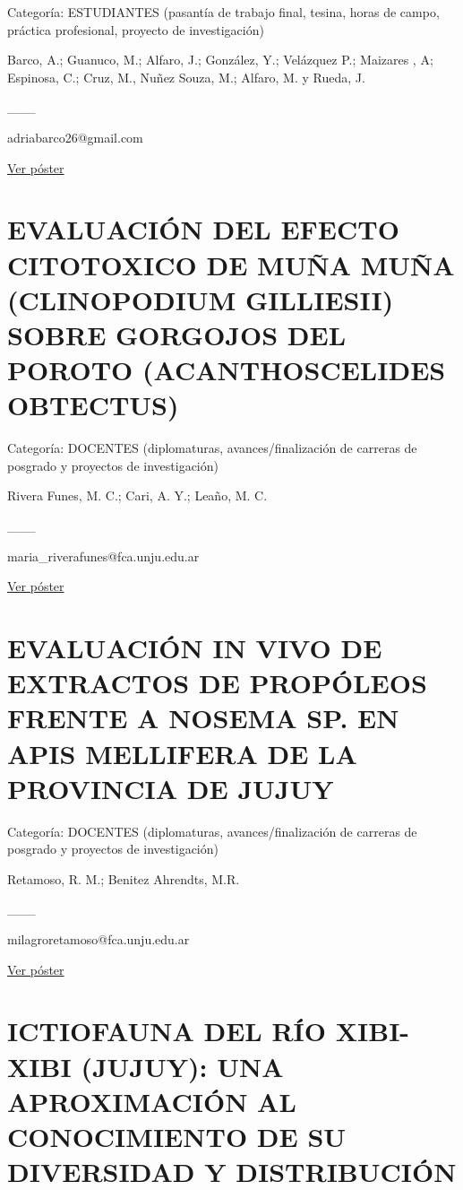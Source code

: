 \documentclass[
  spanish,
  letterpaper,
  DIV=11,
  numbers=noendperiod]{scrreprt}
\begin{document}
Categoría: ESTUDIANTES (pasantía de trabajo final, tesina, horas de
campo, práctica profesional, proyecto de investigación)

Barco, A.; Guanuco, M.; Alfaro, J.; González, Y.; Velázquez P.; Maizares
, A; Espinosa, C.; Cruz, M., Nuñez Souza, M.; Alfaro, M. y Rueda, J.

\_\_\_

adriabarco26@gmail.com

\href{https://drive.google.com/open?id=13i9UKtoZj7QZb9MhyCy5hMvrN237DWA4}{Ver
póster}

\section{EVALUACIÓN DEL EFECTO CITOTOXICO DE MUÑA MUÑA (CLINOPODIUM
GILLIESII) SOBRE GORGOJOS DEL POROTO (ACANTHOSCELIDES
OBTECTUS)}\label{evaluaciuxf3n-del-efecto-citotoxico-de-muuxf1a-muuxf1a-clinopodium-gilliesii-sobre-gorgojos-del-poroto-acanthoscelides-obtectus}

Categoría: DOCENTES (diplomaturas, avances/finalización de carreras de
posgrado y proyectos de investigación)

Rivera Funes, M. C.; Cari, A. Y.; Leaño, M. C.

\_\_\_

maria\_riverafunes@fca.unju.edu.ar

\href{https://drive.google.com/open?id=1swXoRRzkuQal3DEmI9v-BLFP_sQEd0nd}{Ver
póster}

\section{EVALUACIÓN IN VIVO DE EXTRACTOS DE PROPÓLEOS FRENTE A NOSEMA
SP. EN APIS MELLIFERA DE LA PROVINCIA DE
JUJUY}\label{evaluaciuxf3n-in-vivo-de-extractos-de-propuxf3leos-frente-a-nosema-sp.-en-apis-mellifera-de-la-provincia-de-jujuy}

Categoría: DOCENTES (diplomaturas, avances/finalización de carreras de
posgrado y proyectos de investigación)

Retamoso, R. M.; Benitez Ahrendts, M.R.

\_\_\_

milagroretamoso@fca.unju.edu.ar

\href{https://drive.google.com/open?id=1qTJiKOAxBwJ8Lo-NwfG9ezubrI5nDmiX}{Ver
póster}

\section{ICTIOFAUNA DEL RÍO XIBI-XIBI (JUJUY): UNA APROXIMACIÓN AL
CONOCIMIENTO DE SU DIVERSIDAD Y
DISTRIBUCIÓN}\label{ictiofauna-del-ruxedo-xibi-xibi-jujuy-una-aproximaciuxf3n-al-conocimiento-de-su-diversidad-y-distribuciuxf3n}
\end{document}
